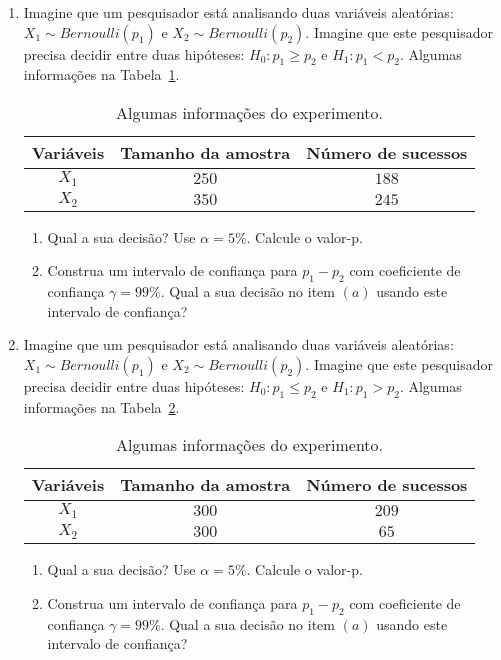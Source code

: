 \documentclass[8pt, a4paper]{article}
\begin{document}
\begin{enumerate}
	\item Imagine que um pesquisador está analisando duas variáveis aleatórias: $X_1 \sim Bernoulli(p_1)$ e $X_2 \sim Bernoulli(p_2)$. Imagine que este pesquisador precisa decidir entre duas hipóteses: $H_0: p_1 \geq p_2$ e $H_1: p_1 < p_2$.  Algumas informações na Tabela~\ref{tab:2-pop-prop-unilateral-h1-upper}.
	\begin{table}[htbp]
		\centering
		\begin{tabular}{c|cc}
			\toprule[0.05cm]
			Variáveis & Tamanho da amostra & Número de sucessos \\ \midrule[0.025cm]
			$X_1$ & $250$ & $188$\\
			$X_2$ & $350$ & $245$\\ 
			\bottomrule[0.05cm]
		\end{tabular}
		\caption{Algumas informações do experimento.}
		\label{tab:2-pop-prop-unilateral-h1-upper}
	\end{table}
	\begin{enumerate}
		\item Qual a sua decisão? Use $\alpha = 5\%$. Calcule o valor-p.
		\item Construa um intervalo de confiança para $p_1 - p_2$ com coeficiente de confiança $\gamma=99\%$. Qual a sua decisão no item $(a)$ usando este intervalo de confiança?
	\end{enumerate}

	\item Imagine que um pesquisador está analisando duas variáveis aleatórias: $X_1 \sim Bernoulli(p_1)$ e $X_2 \sim Bernoulli(p_2)$. Imagine que este pesquisador precisa decidir entre duas hipóteses: $H_0: p_1 \leq p_2$ e $H_1: p_1 > p_2$.  Algumas informações na Tabela~\ref{tab:2-pop-prop-unilateral-h1-lower}.
	\begin{table}[htbp]
		\centering
		\begin{tabular}{c|cc}
			\toprule[0.05cm]
			Variáveis & Tamanho da amostra & Número de sucessos \\ \midrule[0.025cm]
			$X_1$ & $300$ & $209$\\
			$X_2$ & $300$ & $65$\\ 
			\bottomrule[0.05cm]
		\end{tabular}
		\caption{Algumas informações do experimento.}
		\label{tab:2-pop-prop-unilateral-h1-lower}
	\end{table}
	\begin{enumerate}
		\item Qual a sua decisão? Use $\alpha = 5\%$. Calcule o valor-p.
		\item Construa um intervalo de confiança para $p_1 - p_2$ com coeficiente de confiança $\gamma=99\%$. Qual a sua decisão no item $(a)$ usando este intervalo de confiança?
	\end{enumerate}
	

\end{enumerate}
\end{document}
